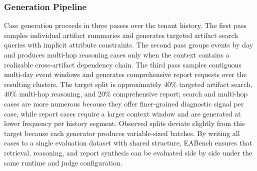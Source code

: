 \subsubsection{Generation Pipeline}

Case generation proceeds in three passes over the tenant history. The first pass samples individual artifact summaries and generates targeted artifact search queries with implicit attribute constraints. The second pass groups events by day and produces multi-hop reasoning cases only when the context contains a realizable cross-artifact dependency chain. The third pass samples contiguous multi-day event windows and generates comprehensive report requests over the resulting clusters. The target split is approximately 40\% targeted artifact search, 40\% multi-hop reasoning, and 20\% comprehensive report; search and multi-hop cases are more numerous because they offer finer-grained diagnostic signal per case, while report cases require a larger context window and are generated at lower frequency per history segment. Observed splits deviate slightly from this target because each generator produces variable-sized batches. By writing all cases to a single evaluation dataset with shared structure, EABench ensures that retrieval, reasoning, and report synthesis can be evaluated side by side under the same runtime and judge configuration.